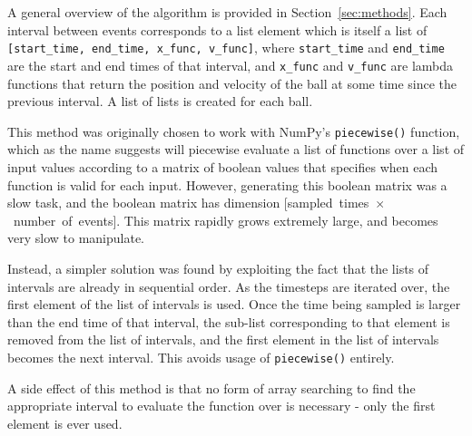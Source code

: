 \documentclass[pra,twocolumn,showpacs,amsmath,amssymb, aps, 10pt]{revtex4-1}
\begin{document}
A general overview of the algorithm is provided in Section~\ref{sec:methods}.
Each interval between events corresponds to a list element which is itself a list
of \texttt{[start\_time,~end\_time,~x\_func,~v\_func]}, where \texttt{start\_time}
and \texttt{end\_time} are the start and end times of that interval, and
\texttt{x\_func} and \texttt{v\_func} are lambda functions that return the
position and velocity of the ball at some time since the previous interval. A
list of lists is created for each ball.

This method was originally chosen to work with NumPy's \texttt{piecewise()}
function, which as the name suggests will piecewise evaluate a list of functions
over a list of input values according to a matrix of boolean values that specifies
when each function is valid for each input. However, generating this boolean matrix
was a slow task, and the boolean matrix has dimension
[sampled~times~$\times$~number~of~events].
This matrix rapidly grows extremely large, and becomes very slow to manipulate.

Instead, a simpler solution was found by exploiting the fact that the lists of
intervals are already in sequential order. As the timesteps are iterated over,
the first element of the list of intervals is used. Once the time being sampled
is larger than the end time of that interval, the sub-list corresponding to that
element is removed from the list of intervals, and the first element in the list
of intervals becomes the next interval. This avoids usage of \texttt{piecewise()}
entirely.

A side effect of this method is that no form of array searching to find the
appropriate interval to evaluate the function over is necessary - only the first
element is ever used.
\end{document}
